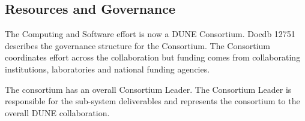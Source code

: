 








\subsection{Resources and Governance}
\label{ch:exec-comp-gov}

The Computing and Software effort is now a DUNE Consortium.  Docdb 12751  describes the governance structure for the Consortium.  The Consortium coordinates effort across the collaboration but funding comes from collaborating institutions, laboratories and national funding agencies. 

The consortium has an overall Consortium Leader. The Consortium Leader is responsible for the sub-system deliverables and represents the consortium to the overall DUNE collaboration.

